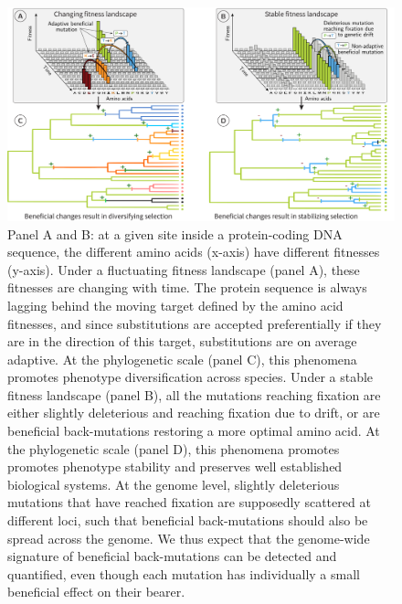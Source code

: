 \documentclass{article}
\begin{document}
    \begin{figure}[!ht]
        \centering
        \includegraphics[width=\textwidth, page=1] {artworks/figure.fitness-landscape}
        \caption{
            Panel A and B: at a given site inside a protein-coding DNA sequence, the different amino acids (x-axis) have different fitnesses (y-axis).
            Under a fluctuating fitness landscape (panel A), these fitnesses are changing with time.
            The protein sequence is always lagging behind the moving target defined by the amino acid fitnesses, and since substitutions are accepted preferentially if they are in the direction of this target, substitutions are on average adaptive.
            At the phylogenetic scale (panel C), this phenomena promotes phenotype diversification across species.
            Under a stable fitness landscape (panel B), all the mutations reaching fixation are either slightly deleterious and reaching fixation due to drift, or are beneficial back-mutations restoring a more optimal amino acid.
            At the phylogenetic scale (panel D), this phenomena promotes promotes phenotype stability and preserves well established biological systems.
            At the genome level, slightly deleterious mutations that have reached fixation are supposedly scattered at different loci, such that beneficial back-mutations should also be spread across the genome.
            We thus expect that the genome-wide signature of beneficial back-mutations can be detected and quantified, even though each mutation has individually a small beneficial effect on their bearer.
        }
        \label{fig:fitness-landscape}
    \end{figure}
\end{document}
